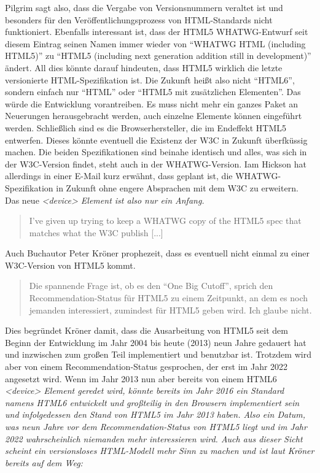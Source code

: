 Pilgrim sagt also, dass die Vergabe von Versionsnummern veraltet ist und 
besonders für den Veröffentlichungsprozess von HTML-Standards nicht funktioniert.
Ebenfalls interessant ist, dass der HTML5 WHATWG-Entwurf seit diesem
Eintrag seinen Namen immer wieder von "`WHATWG HTML (including HTML5)"'
zu "`HTML5 (including next generation addition still in development)"' ändert.
\newline\newline
All dies könnte darauf hindeuten, dass HTML5 wirklich die letzte versionierte
HTML-Spezifikation ist. Die Zukunft heißt also nicht "`HTML6"', sondern
einfach nur "`HTML"' oder "`HTML5 mit zusätzlichen Elementen"'. Das
würde die Entwicklung vorantreiben. Es muss nicht mehr ein ganzes
Paket an Neuerungen herausgebracht werden, auch einzelne Elemente
können eingeführt werden. Schließlich sind es die Browserhersteller, die
im Endeffekt HTML5 entwerfen. Dieses könnte eventuell die Existenz
der W3C in Zukunft überfküssig machen. Die beiden Spezifikationen sind
beinahe identisch und alles, was sich in der W3C-Version findet, steht
auch in der WHATWG-Version. Iam Hickson hat allerdings in einer E-Mail
kurz erwähnt, dass geplant ist, die WHATWG-Spezifikation in Zukunft ohne
engere Absprachen mit dem W3C zu erweitern. Das neue \em{<device>}
Element ist also nur ein Anfang.

\begin{quote}
	I've given up trying to keep a WHATWG copy of the
	HTML5 spec that matches what the W3C publish [...]
\end{quote}

Auch Buchautor Peter Kröner prophezeit, dass es eventuell nicht einmal zu
einer W3C-Version von HTML5 kommt.

\begin{quote}
	Die spannende Frage ist, ob es den "`One Big Cutoff"', sprich den
	Recommendation-Status für HTML5 zu einem Zeitpunkt, an dem
	es noch jemanden interessiert, zumindest für HTML5 geben wird.
	Ich glaube nicht.
\end{quote}

Dies begründet Kröner damit, dass die Ausarbeitung von HTML5 seit
dem Beginn der Entwicklung im Jahr 2004 bis heute (2013) neun
Jahre gedauert hat und inzwischen zum großen Teil implementiert
und benutzbar ist. Trotzdem wird aber von einem Recommendation-Status
gesprochen, der erst im Jahr 2022 angesetzt wird. Wenn im Jahr 2013
nun aber bereits von einem HTML6 \em{<device>} Element geredet wird, 
könnte bereits im Jahr 2016 ein Standard namens HTML6 entwickelt und
großteilig in den Browsern implementiert sein und infolgedessen den
Stand von HTML5 im Jahr 2013 haben. Also ein Datum, was neun Jahre vor
dem Recommendation-Status von HTML5 liegt und im Jahr 2022 wahrscheinlich 
niemanden mehr interessieren wird. Auch aus dieser Sicht scheint ein
versionsloses HTML-Modell mehr Sinn zu machen und ist laut
Kröner bereits auf dem Weg:

